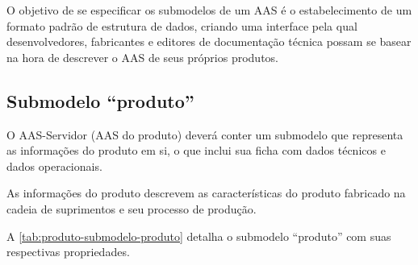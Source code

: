 O objetivo de se especificar os submodelos de um AAS é o estabelecimento de um formato padrão de estrutura de dados, criando uma interface pela qual desenvolvedores, fabricantes e editores de documentação técnica possam se basear na hora de descrever o AAS de seus próprios produtos.

\subsection{Submodelo ``produto''}

O AAS-Servidor (AAS do produto) deverá conter um submodelo que representa as informações do produto em si, o que inclui sua ficha com dados técnicos e dados operacionais.

As informações do produto descrevem as características do produto fabricado na cadeia de suprimentos e seu processo de produção.

A \autoref{tab:produto-submodelo-produto} detalha o submodelo ``produto'' com suas respectivas propriedades.

